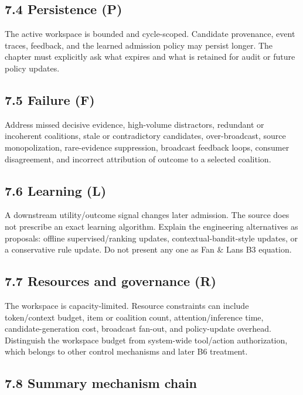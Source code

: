 \subsection{7.4 Persistence (P)}\label{74-persistence-p}

The active workspace is bounded and cycle-scoped. Candidate provenance, event traces, feedback, and the learned admission policy may persist longer. The chapter must explicitly ask what expires and what is retained for audit or future policy updates.

\subsection{7.5 Failure (F)}\label{75-failure-f}

Address missed decisive evidence, high-volume distractors, redundant or incoherent coalitions, stale or contradictory candidates, over-broadcast, source monopolization, rare-evidence suppression, broadcast feedback loops, consumer disagreement, and incorrect attribution of outcome to a selected coalition.

\subsection{7.6 Learning (L)}\label{76-learning-l}

A downstream utility/outcome signal changes later admission. The source does not prescribe an exact learning algorithm. Explain the engineering alternatives as proposals: offline supervised/ranking updates, contextual-bandit-style updates, or a conservative rule update. Do not present any one as Fan \& Lan\textquotesingle s B3 equation.

\subsection{7.7 Resources and governance (R)}\label{77-resources-and-governance-r}

The workspace is capacity-limited. Resource constraints can include token/context budget, item or coalition count, attention/inference time, candidate-generation cost, broadcast fan-out, and policy-update overhead. Distinguish the workspace budget from system-wide tool/action authorization, which belongs to other control mechanisms and later B6 treatment.

\subsection{7.8 Summary mechanism chain}\label{78-summary-mechanism-chain}

